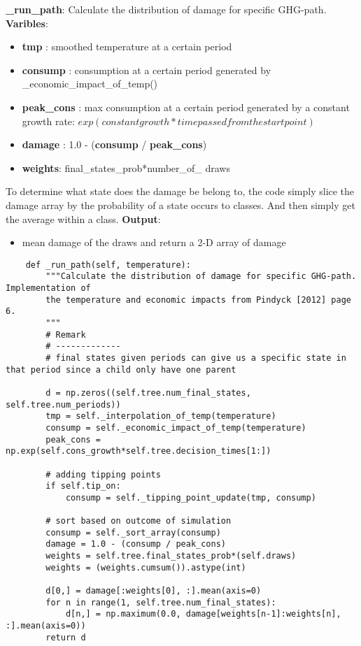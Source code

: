 \documentclass[12pt]{article}
\begin{document}
\textbf{\_run\_path}: Calculate the distribution of damage for specific GHG-path.
\textbf{Varibles}:
\begin{itemize}
  \item \textbf{tmp} : smoothed temperature at a certain period
  \item \textbf{consump} : consumption at a certain period generated by \_economic\_impact\_of\_temp()
  \item \textbf{peak\_cons} : max consumption at a certain period generated by a constant growth rate: $exp(constant growth * time passed from the start point)$
  \item \textbf{damage} : 1.0 - (\textbf{consump} / \textbf{peak\_cons})
  \item \textbf{weights}: final\_states\_prob*number\_of\_ draws
\end{itemize}
To determine what state does the damage be belong to, the code simply slice the damage array by the probability of a state occurs to classes. And then simply get the average within a class.
\textbf{Output}:
\begin{itemize}
  \item mean damage of the draws and return a 2-D array of damage
\end{itemize}
\begin{verbatim}
    def _run_path(self, temperature):
        """Calculate the distribution of damage for specific GHG-path. Implementation of
        the temperature and economic impacts from Pindyck [2012] page 6.
        """
        # Remark
        # -------------
        # final states given periods can give us a specific state in that period since a child only have one parent

        d = np.zeros((self.tree.num_final_states, self.tree.num_periods))
        tmp = self._interpolation_of_temp(temperature)
        consump = self._economic_impact_of_temp(temperature)
        peak_cons = np.exp(self.cons_growth*self.tree.decision_times[1:])

        # adding tipping points
        if self.tip_on:
            consump = self._tipping_point_update(tmp, consump)

        # sort based on outcome of simulation
        consump = self._sort_array(consump)
        damage = 1.0 - (consump / peak_cons)
        weights = self.tree.final_states_prob*(self.draws)
        weights = (weights.cumsum()).astype(int)

        d[0,] = damage[:weights[0], :].mean(axis=0)
        for n in range(1, self.tree.num_final_states):
            d[n,] = np.maximum(0.0, damage[weights[n-1]:weights[n], :].mean(axis=0))
        return d
\end{verbatim}
\end{document}
